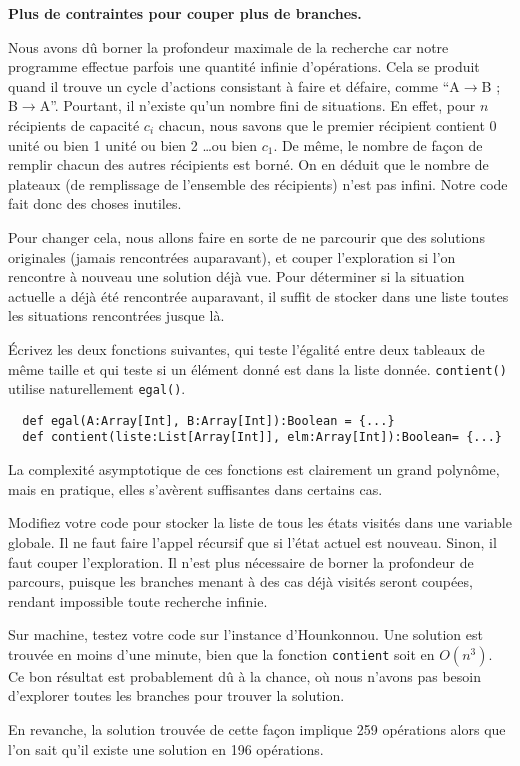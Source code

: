 \documentclass[10pt]{article}\usepackage[nu]{esial}%
\begin{document}
\begin{Exercice}
  \textbf{Plus de contraintes pour couper plus de branches.} 
  
  Nous avons dû borner la profondeur maximale de la recherche car notre
  programme effectue parfois une quantité infinie d'opérations. Cela se produit
  quand il trouve un cycle d'actions consistant à faire et défaire, comme
  ``A$\rightarrow$B ; B$\rightarrow$A''. Pourtant, il n'existe qu'un nombre fini
  de situations. En effet, pour $n$ récipients de capacité $c_i$ chacun, nous
  savons que le premier récipient contient 0 unité ou bien 1 unité ou bien 2
  \ldots ou bien $c_1$. De même, le nombre de façon de remplir chacun des autres
  récipients est borné. On en déduit que le nombre de plateaux (de remplissage
  de l'ensemble des récipients) n'est pas infini. Notre code fait donc des
  choses inutiles.

  Pour changer cela, nous allons faire en sorte de ne parcourir que des
  solutions originales (jamais rencontrées auparavant), et couper l'exploration
  si l'on rencontre à nouveau une solution déjà vue. Pour déterminer si la
  situation actuelle a déjà été rencontrée auparavant, il suffit de stocker dans
  une liste toutes les situations rencontrées jusque là.

  \Question Écrivez les deux fonctions suivantes, qui teste l'égalité entre deux
  tableaux de même taille et qui teste si un élément donné est dans la liste
  donnée. \texttt{contient()} utilise naturellement \texttt{egal()}.
\begin{Verbatim}
  def egal(A:Array[Int], B:Array[Int]):Boolean = {...}
  def contient(liste:List[Array[Int]], elm:Array[Int]):Boolean= {...}
\end{Verbatim}

La complexité asymptotique de ces fonctions est clairement un grand polynôme,
mais en pratique, elles s'avèrent suffisantes dans certains cas.

\Question Modifiez votre code pour stocker la liste de tous les états visités
dans une variable globale. Il ne faut faire l'appel récursif que si l'état
actuel est nouveau. Sinon, il faut couper l'exploration. Il n'est plus
nécessaire de borner la profondeur de parcours, puisque les branches menant à
des cas déjà visités seront coupées, rendant impossible toute recherche infinie.

\begin{Reponse}
  \newcommand*\FancyVerbStartString{// BEGIN SOLVE}
  \newcommand*\FancyVerbStopString{// END SOLVE}
\end{Reponse}

\Question Sur machine, testez votre code sur l'instance d'Hounkonnou. Une
solution est trouvée en moins d'une minute, bien que la fonction
\texttt{contient} soit en $O(n^3)$. Ce bon résultat est probablement dû à la
chance, où nous n'avons pas besoin d'explorer toutes les branches pour trouver
la solution.

En revanche, la solution trouvée de cette façon implique 259 opérations alors
que l'on sait qu'il existe une solution en 196 opérations.
\end{Exercice}
\end{document}
